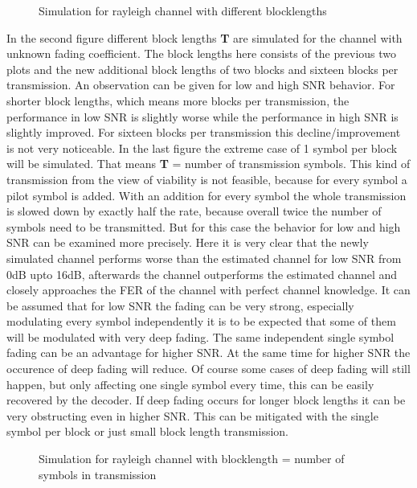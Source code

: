 \begin{figure}[!htb]
	\setlength{}
	\setlength\fheight{0.4\textheight}
	\centering
	
	\caption{Simulation for rayleigh channel with different blocklengths}
	\label{fig:rayfersec}
\end{figure}
In the second figure different block lengths \textbf{T} are simulated for the channel with unknown fading coefficient. The block lengths here consists of the previous two plots and the new additional block lengths of two blocks and sixteen blocks per transmission.
An observation can be given for low and high \gls{SNR} behavior. For shorter block lengths, which means more blocks per transmission, the performance in low SNR is slightly worse while the performance in high \gls{SNR} is slightly improved. For sixteen blocks per transmission this decline/improvement is not very noticeable.
\newline
In the last figure the extreme case of 1 symbol per block will be simulated. That means \textbf{T} = number of transmission symbols. This kind of transmission from the view of viability is not feasible, because for every symbol a pilot symbol is added. With an addition for every symbol the whole transmission is slowed down by exactly half the rate, because overall twice the number of symbols need to be transmitted. But for this case the behavior for low and high SNR can be examined more precisely. 
\newline
Here it is very clear that the newly simulated channel performs worse than the estimated channel for low SNR from 0dB upto 16dB, afterwards the channel outperforms the estimated channel and closely approaches the \gls{FER} of the channel with perfect channel knowledge. It can be assumed that for low SNR the fading can be very strong, especially modulating every symbol independently it is to be expected that some of them will be modulated with very deep fading. The same independent single symbol fading can be an advantage for higher SNR. At the same time for higher SNR the occurence of deep fading will reduce. Of course some cases of deep fading will still happen, but only affecting one single symbol every time, this can be easily recovered by the decoder. If deep fading occurs for longer block lengths it can be very obstructing even in higher SNR. This can be mitigated with the single symbol per block or just small block length transmission.
\begin{figure}[!htb]
	\setlength{}
	\setlength\fheight{0.4\textheight}
	\centering
		
	\caption{Simulation for rayleigh channel with blocklength = number of symbols in transmission}
	\label{fig:rayferthird}
\end{figure}



\clearpage
